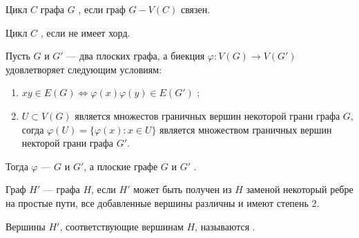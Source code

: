 \begin{definition}
    Цикл $C$ графа $G$ , если граф $G - V(C)$ связен. 
\end{definition}
\begin{definition}
    Цикл $C$ , если не имеет хорд.
\end{definition}
\begin{definition}
    Пусть $G$ и $G'$ --- два плоских графа, а биекция $\varphi \colon V(G) \to V(G')$ удовлетворяет следующим условиям:
	\begin{enumerate}
		\item $xy \in E(G) \Longleftrightarrow \varphi(x) \varphi(y) \in E(G')$ ;
		\item $U \subset V(G)$ является множестов граничных вершин некоторой грани графа $ G$, согда $\varphi(U) = \{\varphi(x) \colon x \in  U\}$ является множеством граничных вершин некторой грани графа $G'$.
	\end{enumerate}
	Тогда $\varphi$ ---  $G$ и $G'$, а плоские графе $G$ и $G'$ .
\end{definition}

\begin{definition}
    Граф $H'$ ---  графа $H$, если $H'$ может быть получен из $H$ заменой некоторый ребре на простые пути, все добавленные вершины различны и имеют степень 2.

	Вершины $H'$, соответствующие вершинам $H$, называются .
\end{definition}
